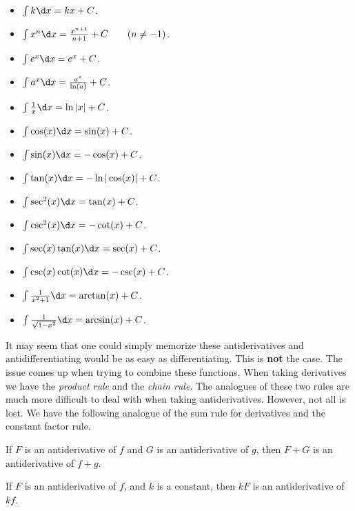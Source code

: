 \documentclass{ximera}
\begin{document}
\begin{theorem}\label{theorem:basicAnti} \hfil
\begin{itemize}
\item $\int k \d x= kx+C$.
\item $\int x^n \d x= \frac{x^{n+1}}{n+1}+C\qquad(n\ne-1)$.
\item $\int e^x \d x= e^x + C$.
\item $\int a^x \d x= \frac{a^x}{\ln(a)}+C$.
\item $\int \frac{1}{x} \d x= \ln|x|+C$.
\item $\int \cos(x) \d x = \sin(x) + C$.
\item $\int \sin(x) \d x = -\cos(x) + C$.  
\item $\int \tan(x) \d x = -\ln|\cos(x)| + C$.  
\item $\int \sec^2(x) \d x = \tan(x) + C$. 
\item $\int \csc^2(x) \d x = -\cot(x) + C$.
\item $\int \sec(x)\tan(x) \d x = \sec(x) + C$.
\item $\int \csc(x)\cot(x) \d x = -\csc(x) + C$.
\item $\int \frac{1}{x^2+1}\d x = \arctan(x) + C$.
\item $\int \frac{1}{\sqrt{1-x^2}}\d x= \arcsin(x)+C$.
\end{itemize}
\end{theorem}

It may seem that one could simply memorize these antiderivatives and
antidifferentiating would be as easy as differentiating. This is
\textbf{not} the case. The issue comes up when trying to combine these
functions.  When taking derivatives we have the \textit{product rule}
and the \textit{chain rule}. The analogues of these two rules are much
more difficult to deal with when taking antiderivatives. However, not
all is lost. We have the following analogue of the sum rule for
derivatives and the constant factor rule.

\begin{theorem}\label{theorem:SRA}
If $F$ is an antiderivative of $f$ and $G$ is an antiderivative of
$g$, then $F+G$ is an antiderivative of $f+g$.
\end{theorem}

\begin{theorem}\label{theorem:CFRA}
If $F$ is an antiderivative of $f$, and $k$ is a constant, then $kF$
is an antiderivative of $kf$.
\end{theorem}
\end{document}

